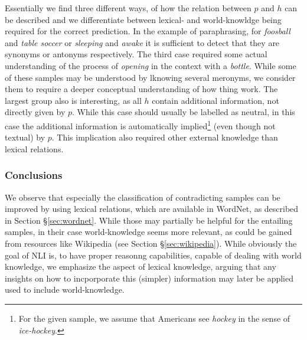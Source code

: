 Essentially we find three different ways, of how the relation between $p$ and $h$ can be described and we differentiate between lexical- and world-knowldge being required for the correct prediction. In the example of paraphrasing, for \textit{foosball} and \textit{table soccer} or \textit{sleeping} and \textit{awake} it is sufficient to detect that they are synonyms or antonyms respectively. The third case required some actual understanding of the process of \textit{opening} in the context with a \textit{bottle}. While some of these samples may be understood by lknowing several meronyms, we consider them to require a deeper conceptual understanding of how thing work. The largest group also is interesting, as all $h$ contain additional information, not directly given by $p$. While this case should usually be labelled as neutral, in this case the additional information is automatically implied\footnote{For the given sample, we assume that Americans see \textit{hockey} in the sense of \textit{ice-hockey}.} (even though not textual) by $p$. This implication also required other external knowledge than lexical relations.

\subsubsection{Conclusions}
We observe that especially the classification of contradicting samples can be improved by using lexical relations, which are available in WordNet, as described in Section §\ref{sec:wordnet}. While those may partially be helpful for the entailing samples, in their case world-knowledge seems more relevant, as could be gained from resources like Wikipedia (see Section §\ref{sec:wikipedia}). While obviously the goal of \ac{NLI} is, to have proper reasonng capabilities, capable of dealing with world knowledge, we emphasize the aspect of lexical knowledge, arguing that any insights on how to incporporate this (simpler) information may later be applied used to include world-knowledge.
\newline

